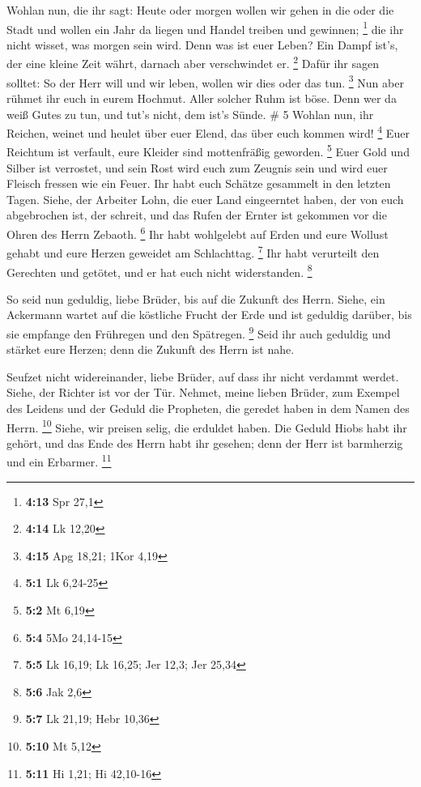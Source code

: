  Wohlan nun, die ihr sagt: Heute oder morgen wollen wir
gehen in die oder die Stadt und wollen ein Jahr da liegen und Handel
treiben und gewinnen; \footnote{\textbf{4:13} Spr 27,1} 
die ihr nicht wisset, was morgen sein wird. Denn was ist euer Leben? Ein
Dampf ist's, der eine kleine Zeit währt, darnach aber verschwindet er.
\footnote{\textbf{4:14} Lk 12,20}  Dafür ihr sagen
solltet: So der Herr will und wir leben, wollen wir dies oder das tun.
\footnote{\textbf{4:15} Apg 18,21; 1Kor 4,19}  Nun aber
rühmet ihr euch in eurem Hochmut. Aller solcher Ruhm ist böse.
 Denn wer da weiß Gutes zu tun, und tut's nicht, dem
ist's Sünde. \# 5  Wohlan nun, ihr Reichen, weinet und
heulet über euer Elend, das über euch kommen wird! \footnote{\textbf{5:1}
  Lk 6,24-25}  Euer Reichtum ist verfault, eure Kleider
sind mottenfräßig geworden. \footnote{\textbf{5:2} Mt 6,19}
 Euer Gold und Silber ist verrostet, und sein Rost wird
euch zum Zeugnis sein und wird euer Fleisch fressen wie ein Feuer. Ihr
habt euch Schätze gesammelt in den letzten Tagen.  Siehe,
der Arbeiter Lohn, die euer Land eingeerntet haben, der von euch
abgebrochen ist, der schreit, und das Rufen der Ernter ist gekommen vor
die Ohren des Herrn Zebaoth. \footnote{\textbf{5:4} 5Mo 24,14-15}
 Ihr habt wohlgelebt auf Erden und eure Wollust gehabt und
eure Herzen geweidet am Schlachttag. \footnote{\textbf{5:5} Lk 16,19; Lk
  16,25; Jer 12,3; Jer 25,34}  Ihr habt verurteilt den
Gerechten und getötet, und er hat euch nicht widerstanden. \footnote{\textbf{5:6}
  Jak 2,6}

 So seid nun geduldig, liebe Brüder, bis auf die Zukunft
des Herrn. Siehe, ein Ackermann wartet auf die köstliche Frucht der Erde
und ist geduldig darüber, bis sie empfange den Frühregen und den
Spätregen. \footnote{\textbf{5:7} Lk 21,19; Hebr 10,36} 
Seid ihr auch geduldig und stärket eure Herzen; denn die Zukunft des
Herrn ist nahe.

 Seufzet nicht widereinander, liebe Brüder, auf dass ihr
nicht verdammt werdet. Siehe, der Richter ist vor der Tür.
 Nehmet, meine lieben Brüder, zum Exempel des Leidens und
der Geduld die Propheten, die geredet haben in dem Namen des Herrn.
\footnote{\textbf{5:10} Mt 5,12}  Siehe, wir preisen
selig, die erduldet haben. Die Geduld Hiobs habt ihr gehört, und das
Ende des Herrn habt ihr gesehen; denn der Herr ist barmherzig und ein
Erbarmer. \footnote{\textbf{5:11} Hi 1,21; Hi 42,10-16}

